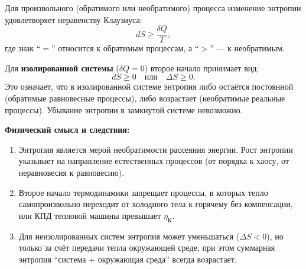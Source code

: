 \begin{theorem}
Для произвольного (обратимого или необратимого) процесса изменение энтропии удовлетворяет неравенству Клаузиуса:
\begin{equation}
    dS \ge \frac{\delta Q}{T}, \label{eq:second_law_math}
\end{equation}
где знак ``$=$'' относится к обратимым процессам, а ``$>$'' --- к необратимым.
\par\noindent Для \textbf{изолированной системы} ($\delta Q = 0$) второе начало принимает вид:
\begin{equation}
    dS \ge 0 \quad \text{или} \quad \Delta S \ge 0. \label{eq:second_law_isolated}
\end{equation}
Это означает, что в изолированной системе энтропия либо остаётся постоянной (обратимые равновесные процессы), либо возрастает (необратимые реальные процессы). Убывание энтропии в замкнутой системе невозможно.
\end{theorem}

\begin{remark}
\textbf{Физический смысл и следствия:}
\begin{enumerate}
    \item Энтропия является мерой необратимости рассеяния энергии. Рост энтропии указывает на направление естественных процессов (от порядка к хаосу, от неравновесия к равновесию).
    \item Второе начало термодинамики запрещает процессы, в которых тепло самопроизвольно переходит от холодного тела к горячему без компенсации, или КПД тепловой машины превышает $\eta_{\text{К}}$.
    \item Для неизолированных систем энтропия может уменьшаться ($\Delta S < 0$), но только за счёт передачи тепла окружающей среде, при этом суммарная энтропия ``система + окружающая среда'' всегда возрастает.
\end{enumerate}
\end{remark}

